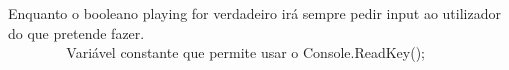 Enquanto o booleano playing for verdadeiro irá sempre pedir input ao utilizador do que pretende fazer. ~\newline
~\newline
~\newline
~\newline
~\newline
~\newline
~\newline
~\newline
~\newline
~\newline
~\newline
~\newline
~\newline
~\newline
~\newline
~\newline
~\newline
~\newline
~\newline
~\newline
~\newline
~\newline
~\newline
~\newline
~\newline
~\newline
~\newline
~\newline
~\newline
~\newline
~\newline
~\newline
~\newline
~\newline
~\newline
~\newline
 Variável constante que permite usar o Console.\+Read\+Key();

